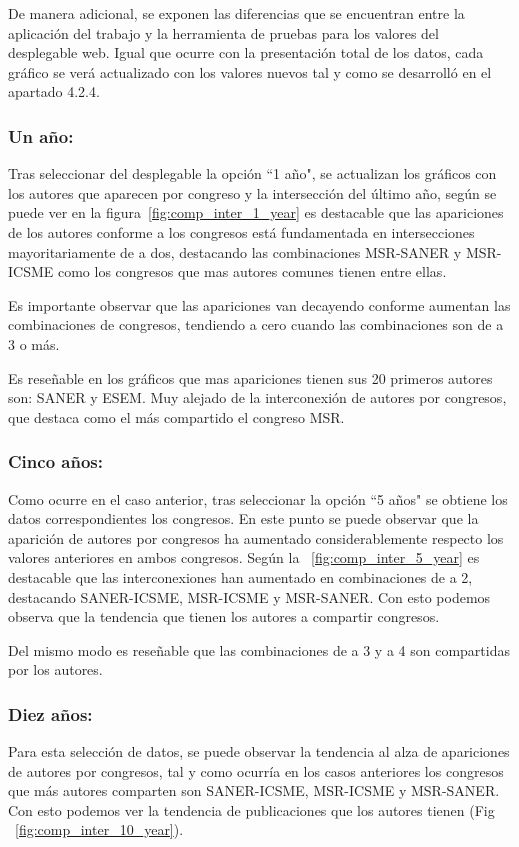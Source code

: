 \documentclass[a4paper, 12pt]{book}
\begin{document}
De manera adicional, se exponen las diferencias que se encuentran entre la aplicación del trabajo y la herramienta de pruebas para los valores del desplegable web. Igual que ocurre con la presentación total de los datos, cada gráfico se verá actualizado con los valores nuevos tal y como se desarrolló en el apartado 4.2.4.

\subsubsection{Un año:}
Tras seleccionar del desplegable la opción ``1 año", se actualizan los gráficos con los autores que aparecen por congreso y la intersección del último año, según se puede ver en la figura~\ref{fig:comp_inter_1_year} es destacable que las apariciones de los autores conforme a los congresos está fundamentada en intersecciones mayoritariamente de a dos, destacando las combinaciones MSR-SANER y MSR-ICSME como los congresos que mas autores comunes tienen entre ellas.

Es importante observar que las apariciones van decayendo conforme aumentan las combinaciones de congresos, tendiendo a cero cuando las combinaciones son de a 3 o más.

Es reseñable en los gráficos que mas apariciones tienen sus 20 primeros autores son: SANER y ESEM. Muy alejado de la interconexión de autores por congresos, que destaca como el más compartido el congreso MSR.

\subsubsection{Cinco años:}
Como ocurre en el caso anterior, tras seleccionar la opción ``5 años" se obtiene los datos correspondientes los congresos. En este punto se puede observar que la aparición de autores por congresos ha aumentado considerablemente respecto los valores anteriores en ambos congresos. Según la ~\ref{fig:comp_inter_5_year} es destacable que las interconexiones han aumentado en combinaciones de a 2, destacando SANER-ICSME, MSR-ICSME y MSR-SANER. Con esto podemos observa que la tendencia que tienen los autores a compartir congresos.

Del mismo modo es reseñable que las combinaciones de a 3 y a 4 son compartidas por los autores. 


\subsubsection{Diez años:}
Para esta selección de datos, se puede observar la tendencia al alza de apariciones de autores por congresos, tal y como ocurría en los casos anteriores los congresos que más autores comparten son SANER-ICSME, MSR-ICSME y MSR-SANER. Con esto podemos ver la tendencia de publicaciones que los autores tienen (Fig ~\ref{fig:comp_inter_10_year}).
\end{document}
